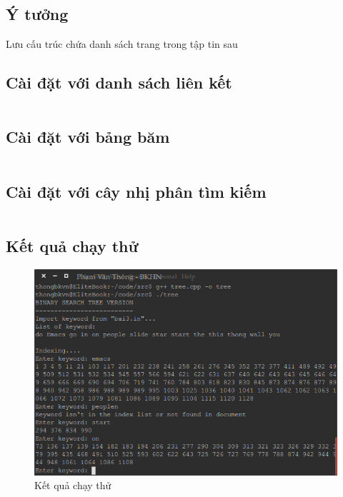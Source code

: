 \documentclass[8pt, a4paper]{article}
\newcommand{\mnt}[1]{\inputminted[frame=single, linenos=true, tabsize=4]{c++}{#1}}
\begin{document}
\subsection{Ý tưởng}
Lưu cấu trúc chứa danh sách trang trong tập tin sau 

\subsection{Cài đặt với danh sách liên kết}
\mnt{src/linkedlist.cpp}

\subsection{Cài đặt với bảng băm}
\mnt{src/hashtable.cpp}

\subsection{Cài đặt với cây nhị phân tìm kiếm}
\mnt{src/tree.cpp}

\subsection{Kết quả chạy thử}
\begin{figure}[htp]
\centering
\includegraphics[scale=0.5]{img/kqbai3.png}
\caption{Kết quả chạy thử}
\label{}
\end{figure}
\end{document}
